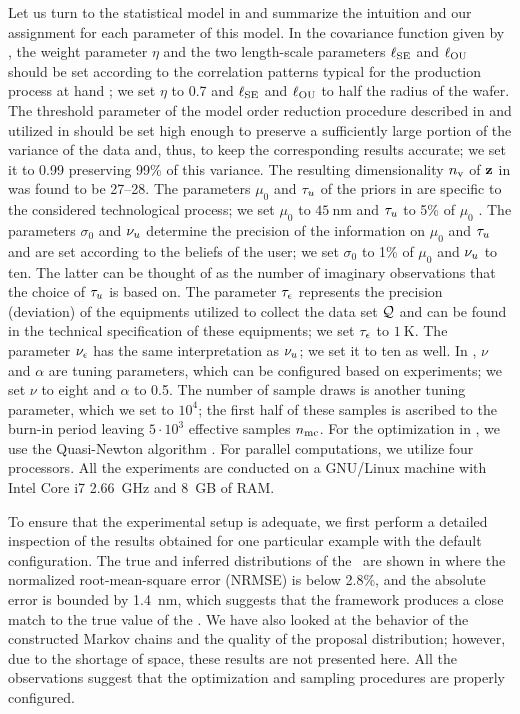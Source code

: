 Let us turn to the statistical model in  and summarize the intuition and our assignment for each parameter of this model.
In the covariance function given by , the weight parameter $\eta$ and the two length-scale parameters $\ell_{\text{SE}}$ and $\ell_{\text{OU}}$ should be set according to the correlation patterns typical for the production process at hand \cite{chandrakasan2001, cheng2011}; we set $\eta$ to 0.7 and $\ell_{\text{SE}}$ and $\ell_{\text{OU}}$ to half the radius of the wafer.
The threshold parameter of the model order reduction procedure described in  and utilized in  should be set high enough to preserve a sufficiently large portion of the variance of the data and, thus, to keep the corresponding results accurate; we set it to 0.99 preserving 99\% of this variance. The resulting dimensionality ${n_\text{v}}$ of $\mathbf{z}$ in  was found to be 27--28.
The parameters $\mu_0$ and $\tau_u$ of the priors in  are specific to the considered technological process; we set $\mu_0$ to $45~\text{nm}$ and $\tau_u$ to 5\% of $\mu_0$ \cite{juan2012}.
The parameters $\sigma_0$ and $\nu_u$ determine the precision of the information on $\mu_0$ and $\tau_u$ and are set according to the beliefs of the user; we set $\sigma_0$ to 1\% of $\mu_0$ and $\nu_u$ to ten.
The latter can be thought of as the number of imaginary observations that the choice of $\tau_u$ is based on.
The parameter $\tau_\epsilon$ represents the precision (deviation) of the equipments utilized to collect the data set $\mathcal{Q}$ and can be found in the technical specification of these equipments; we set $\tau_\epsilon$ to $1~\text{K}$. The parameter $\nu_\epsilon$ has the same interpretation as $\nu_u$; we set it to ten as well.
In , $\nu$ and $\alpha$ are tuning parameters, which can be configured based on experiments; we set $\nu$ to eight and $\alpha$ to 0.5.
The number of sample draws is another tuning parameter, which we set to $10^4$; the first half of these samples is ascribed to the burn-in period leaving $5 \cdot 10^3$ effective samples ${n_\text{mc}}$.
For the optimization in , we use the Quasi-Newton algorithm \cite{press2007}.
For parallel computations, we utilize four processors.
All the experiments are conducted on a GNU/Linux machine with Intel Core i7 2.66~GHz and 8~GB of RAM.

To ensure that the experimental setup is adequate, we first perform a detailed inspection of the results obtained for one particular example with the default configuration.
The true and inferred distributions of the \qoi\ are shown in  where the normalized root-mean-square error (NRMSE) is below 2.8\%, and the absolute error is bounded by 1.4~nm, which suggests that the framework produces a close match to the true value of the \qoi.
We have also looked at the behavior of the constructed Markov chains and the quality of the proposal distribution; however, due to the shortage of space, these results are not presented here.
All the observations suggest that the optimization and sampling procedures are properly configured.

